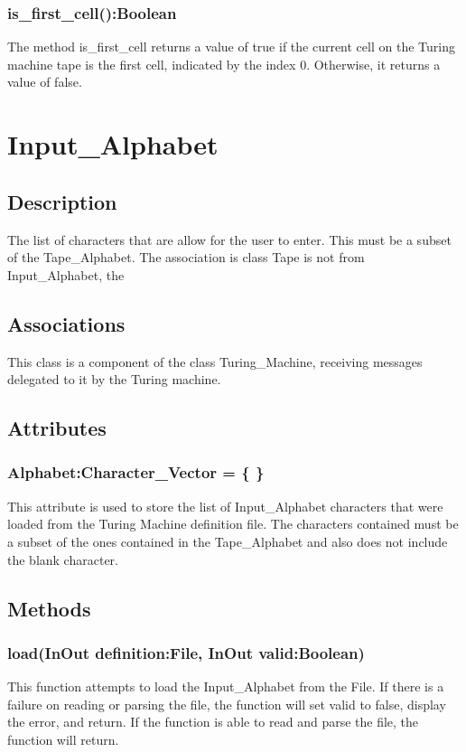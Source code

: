 \documentclass{report}
\begin{document}
    \subsubsection{is\_first\_cell():Boolean}
    
    The method is\_first\_cell returns a value of true if the current cell on the Turing machine tape is the first cell, indicated by the index 0. Otherwise, it returns a value of false.
    
    
    
    
    
    
    
      \section{Input\_Alphabet}
	\subsection{Description}
    	The list of characters that are allow for the user to enter. This must be a subset of the Tape\_Alphabet.
        The association is class Tape is not from Input\_Alphabet, the
    \subsection{Associations}
    This class is a component of the class Turing\_Machine, receiving messages delegated to it by the Turing machine.
        
    \subsection{Attributes} 
    
    \subsubsection{Alphabet:Character\_Vector = \{ \}}
    This attribute is used to store the list of Input\_Alphabet characters that were loaded from the Turing Machine definition file. The characters contained must be a subset of the ones contained in the Tape\_Alphabet and also does not include the blank character.
    
    \subsection{Methods} 
    \subsubsection{load(InOut definition:File, InOut valid:Boolean)}
    This function attempts to load the Input\_Alphabet from the File. If there is a failure on reading or parsing the file, the function will set valid to false, display the error, and return. If the function is able to read and parse the file, the function will return.
    
\end{document}
